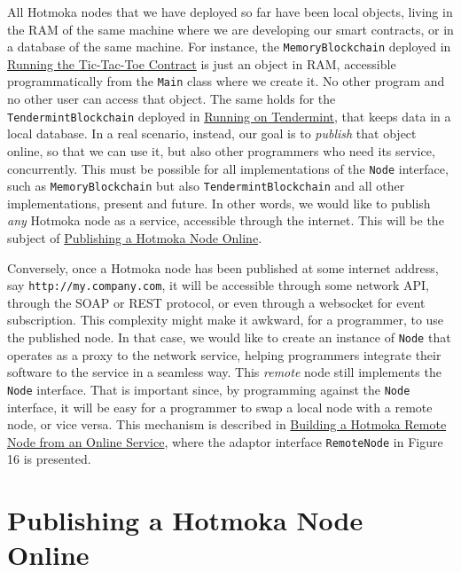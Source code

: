 \documentclass[a4paper,]{book}
\begin{document}
{All Hotmoka nodes that we have deployed so far have been local objects,
living in the RAM of the same machine where we are developing our smart
contracts, or in a database of the same machine. For instance, the
\texttt{MemoryBlockchain} deployed in
\protect\hyperlink{running-the-tic-tac-toe-contract}{Running the
Tic-Tac-Toe Contract} is just an object in RAM, accessible
programmatically from the \texttt{Main} class where we create it. No
other program and no other user can access that object. The same holds
for the \texttt{TendermintBlockchain} deployed in
\protect\hyperlink{tendermint}{Running on Tendermint}, that keeps data
in a local database. In a real scenario, instead, our goal is to
\emph{publish} that object online, so that we can use it, but also other
programmers who need its service, concurrently. This must be possible
for all implementations of the \texttt{Node} interface, such as
\texttt{MemoryBlockchain} but also \texttt{TendermintBlockchain} and all
other implementations, present and future. In other words, we would like
to publish \emph{any} Hotmoka node as a service, accessible through the
internet. This will be the subject of
\protect\hyperlink{publishing-a-hotmoka-node-online}{Publishing a
Hotmoka Node Online}.

Conversely, once a Hotmoka node has been published at some internet
address, say \texttt{http://my.company.com}, it will be accessible
through some network API, through the SOAP or REST protocol, or even
through a websocket for event subscription. This complexity might make
it awkward, for a programmer, to use the published node. In that case,
we would like to create an instance of \texttt{Node} that operates as a
proxy to the network service, helping programmers integrate their
software to the service in a seamless way. This \emph{remote} node still
implements the \texttt{Node} interface. That is important since, by
programming against the \texttt{Node} interface, it will be easy for a
programmer to swap a local node with a remote node, or vice versa. This
mechanism is described in
\protect\hyperlink{building-a-hotmoka-remote-node-from-an-online-service}{Building
a Hotmoka Remote Node from an Online Service}, where the adaptor
interface \texttt{RemoteNode} in Figure 16 is presented.

\hypertarget{publishing-a-hotmoka-node-online}{%
\section{Publishing a Hotmoka Node Online
}\label{publishing-a-hotmoka-node-online}}

}
\end{document}
